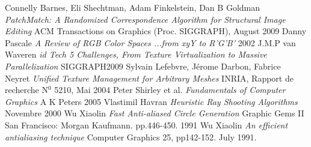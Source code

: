 \begin{thebibliography}{99}
		Connelly Barnes, Eli Shechtman, Adam Finkelstein, Dan B Goldman
		\emph{PatchMatch: A Randomized Correspondence Algorithm for Structural Image Editing}
		ACM Transactions on Graphics (Proc. SIGGRAPH), August 2009
		Danny Pascale
		\emph{A Review of RGB Color Spaces ...from xyY to R'G'B'}
		2002
		J.M.P van Waveren
		\emph{id Tech 5 Challenges, From Texture Virtualization to Massive Parallelization}
		SIGGRAPH2009
		Sylvain Lefebvre, Jérome Darbon, Fabrice Neyret
		\emph{Unified Texture Management for Arbitrary Meshes}
		INRIA, Rapport de recherche N$^{0}$ 5210, Mai 2004
		Peter Shirley et al.
		\emph{Fundamentals of Computer Graphics}
		A K Peters 2005
		Vlastimil Havran
		\emph{Heuristic Ray Shooting Algorithms}
		Novembre 2000
		Wu Xiaolin
		\emph{Fast Anti-aliased Circle Generation}
		Graphic Gems II San Francisco: Morgan Kaufmann. pp.446-450. 1991
		Wu Xiaolin
		\emph{An efficient antialiasing technique}
		Computer Graphics 25, pp142-152. July 1991.
		
		

\end{thebibliography}
